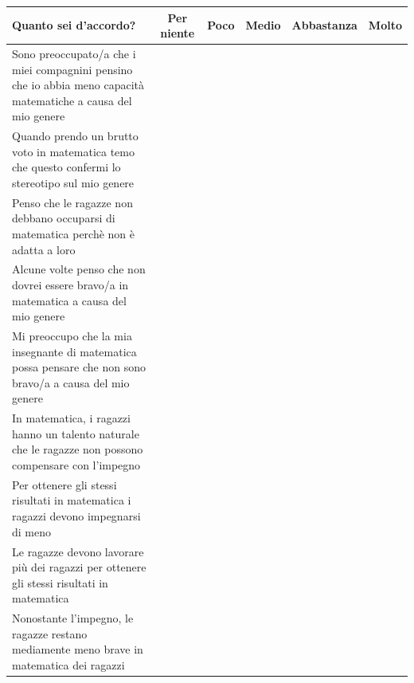 \noindent\begin{tabular}{|p{7cm}|c|c|c|c|c|}
  \hline
  \textbf{Quanto sei d'accordo?} & \textbf{Per niente} & \textbf{Poco} & \textbf{Medio} & \textbf{Abbastanza} & \textbf{Molto} \\
  \hline
  Sono preoccupato/a che i miei compagnini pensino che io abbia meno capacità matematiche a causa del mio genere & & & & & \\
  \hline
  Quando prendo un brutto voto in matematica temo che questo confermi lo stereotipo sul mio genere & & & & & \\
  \hline
  Penso che le ragazze non debbano occuparsi di matematica perchè non è adatta a loro & & & & & \\
  \hline
  Alcune volte penso che non dovrei essere bravo/a in matematica a causa del mio genere & & & & & \\
  \hline
  Mi preoccupo che la mia insegnante di matematica possa pensare che non sono bravo/a a causa del mio genere & & & & & \\
  \hline
  In matematica, i ragazzi hanno un talento naturale che le ragazze non possono compensare con l’impegno & & & & & \\
  \hline 
  Per ottenere gli stessi risultati in matematica i ragazzi devono impegnarsi di meno & & & & & \\
  \hline
  Le ragazze devono lavorare più dei ragazzi per ottenere gli stessi risultati in matematica & & & & & \\
  \hline
  Nonostante l’impegno, le ragazze restano mediamente meno brave in matematica dei ragazzi & & & & & \\
  \hline
\end{tabular}

































\restoregeometry
